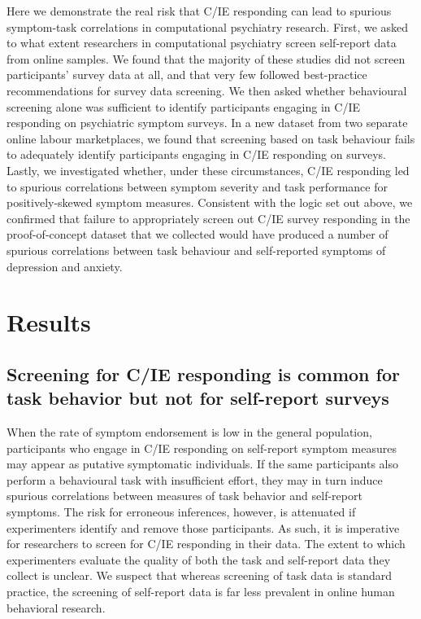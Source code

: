 \documentclass[a4paper,notitlepage,12pt]{article}
\begin{document}
Here we demonstrate the real risk that C/IE responding can lead to spurious symptom-task correlations in computational psychiatry research. First, we asked to what extent researchers in computational psychiatry screen self-report data from online samples. We found that the majority of these studies did not screen participants' survey data at all, and that very few followed best-practice recommendations for survey data screening. We then asked whether behavioural screening alone was sufficient to identify participants engaging in C/IE responding on psychiatric symptom surveys. In a new dataset from two separate online labour marketplaces, we found that screening based on task behaviour fails to adequately identify participants engaging in C/IE responding on surveys. Lastly, we investigated whether, under these circumstances, C/IE responding led to spurious correlations between symptom severity and task performance for positively-skewed symptom measures. Consistent with the logic set out above, we confirmed that failure to appropriately screen out C/IE survey responding in the proof-of-concept dataset that we collected would have produced a number of spurious correlations between task behaviour and self-reported symptoms of depression and anxiety.

\section{Results}

\subsection{Screening for C/IE responding is common for task behavior but not for self-report surveys}

When the rate of symptom endorsement is low in the general population, participants who engage in C/IE responding on self-report symptom measures may appear as putative symptomatic individuals. If the same participants also perform a behavioural task with insufficient effort, they may in turn induce spurious correlations between measures of task behavior and self-report symptoms. The risk for erroneous inferences, however, is attenuated if experimenters identify and remove those participants. As such, it is imperative for researchers to screen for C/IE responding in their data. The extent to which experimenters evaluate the quality of both the task and self-report data they collect is unclear. We suspect that whereas screening of task data is standard practice, the screening of self-report data is far less prevalent in online human behavioral research. 
\end{document}
